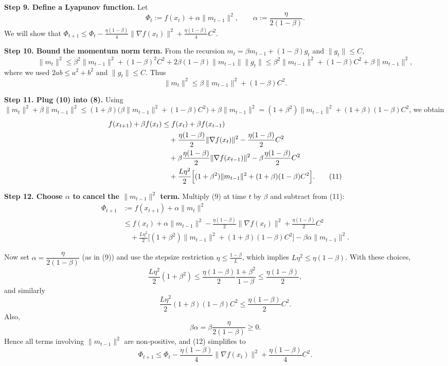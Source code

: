 \documentclass{article}
\begin{document}
\noindent\textbf{Step 9. Define a Lyapunov function.}  
Let
\[
    \Phi_t := f(x_t) + \alpha\|m_{t-1}\|^{2},
\qquad
    \alpha:=\frac{\eta}{2(1-\beta)}.
\tag{9}
\]
We will show that $\Phi_{t+1}\le\Phi_t - \frac{\eta(1-\beta)}{4}\|\nabla f(x_t)\|^{2}
    +\frac{\eta(1-\beta)}{4}C^{2}$.

\noindent\textbf{Step 10. Bound the momentum norm term.}  
From the recursion $m_t = \beta m_{t-1} + (1-\beta)g_t$ and $\|g_t\|\le C$,
\[
\|m_t\|^{2}
    \le \beta^{2}\|m_{t-1}\|^{2}
        + (1-\beta)^{2}C^{2}
        +2\beta(1-\beta)\|m_{t-1}\|\|g_t\|
    \le \beta^{2}\|m_{t-1}\|^{2}+ (1-\beta)C^{2} +\beta\|m_{t-1}\|^{2},
\]
where we used $2ab\le a^{2}+b^{2}$ and $\|g_t\|\le C$.
Thus
\[
\|m_t\|^{2}\le \beta\|m_{t-1}\|^{2} + (1-\beta)C^{2}.
\tag{10}
\]

\noindent\textbf{Step 11. Plug (10) into (8).}  
Using $\|m_t\|^{2}+\beta\|m_{t-1}\|^{2}
    \le (1+\beta)\bigl(\beta\|m_{t-1}\|^{2}+(1-\beta)C^{2}\bigr)
    +\beta\|m_{t-1}\|^{2}
    = (1+\beta^{2})\|m_{t-1}\|^{2}+ (1+\beta)(1-\beta)C^{2}$,
we obtain
\[
\begin{aligned}
    f(x_{t+1})+\beta f(x_t)
    &\le f(x_t)+\beta f(x_{t-1})  \\
    &\quad +\frac{\eta(1-\beta)}{2}\|\nabla f(x_t)\|^{2}
          -\frac{\eta(1-\beta)}{2}C^{2}\\
    &\quad +\beta\frac{\eta(1-\beta)}{2}\|\nabla f(x_{t-1})\|^{2}
          -\beta\frac{\eta(1-\beta)}{2}C^{2}\\
    &\quad +\frac{L\eta^{2}}{2}\Bigl[(1+\beta^{2})\|m_{t-1}\|^{2}
                                   +(1+\beta)(1-\beta)C^{2}\Bigr].
\tag{11}
\end{aligned}
\]

\noindent\textbf{Step 12. Choose $\alpha$ to cancel the $\|m_{t-1}\|^{2}$ term.}  
Multiply (9) at time $t$ by $\beta$ and subtract from (11):
\[
\begin{aligned}
    \Phi_{t+1}
    &:= f(x_{t+1})+\alpha\|m_t\|^{2} \\
    &\le f(x_t)+\alpha\|m_{t-1}\|^{2}
       -\frac{\eta(1-\beta)}{2}\|\nabla f(x_t)\|^{2}
       +\frac{\eta(1-\beta)}{2}C^{2} \\
    &\quad +\frac{L\eta^{2}}{2}\bigl[(1+\beta^{2})\|m_{t-1}\|^{2}
                                   +(1+\beta)(1-\beta)C^{2}\bigr]
       -\beta\alpha\|m_{t-1}\|^{2}.
\end{aligned}
\tag{12}
\]

Now set $\alpha=\dfrac{\eta}{2(1-\beta)}$ (as in (9)) and use the stepsize
restriction $\eta\le\frac{1-\beta}{L}$, which implies $L\eta^{2}\le\eta(1-\beta)$.
With these choices,
\[
\frac{L\eta^{2}}{2}(1+\beta^{2})\le
\frac{\eta(1-\beta)}{2}\frac{1+\beta^{2}}{1-\beta}
\le\frac{\eta(1-\beta)}{2},
\]
and similarly
\[
\frac{L\eta^{2}}{2}(1+\beta)(1-\beta)C^{2}
\le\frac{\eta(1-\beta)}{2}C^{2}.
\]
Also,
\[
\beta\alpha = \beta\frac{\eta}{2(1-\beta)}\ge 0.
\]
Hence all terms involving $\|m_{t-1}\|^{2}$ are non‑positive, and (12) simplifies to
\[
\Phi_{t+1}
\le \Phi_t
   -\frac{\eta(1-\beta)}{4}\|\nabla f(x_t)\|^{2}
   +\frac{\eta(1-\beta)}{4}C^{2}.
\tag{13}
\]
\end{document}
